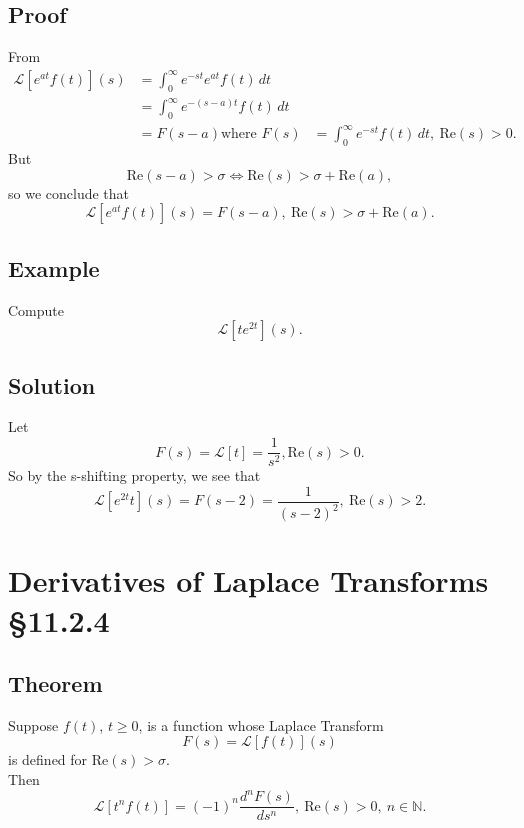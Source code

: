 \documentclass[11pt]{article}
\newcommand{\naturals}{\mathbb{N}}
\newcommand{\Laplace}{\mathscr{L}}
\begin{document}
\subsection{Proof}
From
\begin{align*}
\Laplace[e^{at}f(t)](s) &= \int_0^\infty e^{-st}e^{at}f(t)\, dt \\
&= \int_0^\infty e^{-(s-a)t}f(t)\, dt \\
&= F(s - a)
\text{where } F(s) &= \int_0^\infty e^{-st} f(t)\, dt,\ \text{Re}(s) > 0.
\end{align*}
But
\[ \text{Re}(s-a) > \sigma \Leftrightarrow \text{Re}(s) > \sigma + \text{Re}(a), \]
so we conclude that
\[ \Laplace[e^{at} f(t)](s) = F(s-a),\ \text{Re}(s) > \sigma + \text{Re}(a). \]

\subsection{Example}
Compute
\[ \Laplace[te^{2t}](s). \]

\subsection*{Solution}
Let
\[ F(s) = \Laplace[t] = \frac{1}{s^2}, \text{Re}(s) > 0. \]
So by the s-shifting property, we see that
\[ \Laplace[e^{2t}t](s) = F(s-2) = \frac{1}{(s-2)^2},\ \text{Re}(s) > 2. \]

\section{Derivatives of Laplace Transforms §11.2.4}
\subsection{Theorem}
Suppose $f(t)$, $t \geq 0$, is a function whose Laplace Transform
\[ F(s) = \Laplace[f(t)](s) \]
is defined for $\text{Re}(s) > \sigma$.\\
Then
\[ \Laplace[t^nf(t)] = (-1)^n \frac{d^nF(s)}{ds^n},\ \text{Re}(s) > 0,\ n \in \naturals. \]
\end{document}
